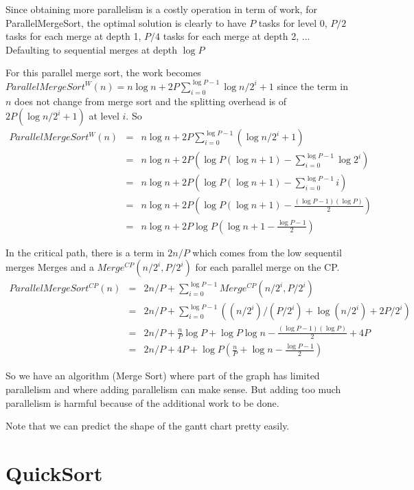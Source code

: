 \documentclass{article}
\begin{document}
Since obtaining more parallelism is a costly operation in term of
work, for ParallelMergeSort, the optimal solution is clearly to have
$P$ tasks for level 0, $P/2$ tasks for each merge at depth 1,
$P/4$ tasks for each merge at depth 2, ... Defaulting to sequential
merges at depth $\log P$

For this parallel merge sort, the work becomes
$ParallelMergeSort^W(n) = n \log n + 2 P \sum_{i=0}^{\log P - 1} \log n/2^i + 1$
since the term in $n$ does not change
from merge sort and the splitting overhead is of $2P (\log n/2^i + 1)$ at
level $i$. So
\begin{align}
  ParallelMergeSort^W(n) & = & n \log n + 2 P \sum_{i=0}^{\log P - 1}( \log n/2^i + 1  )\\
  & = &n \log n + 2 P \left (\log P (\log n +1)- \sum_{i=0}^{\log P - 1} \log 2^i  \right )  \\
  & = &n \log n + 2 P \left (\log P (\log n +1)- \sum_{i=0}^{\log P - 1} i \right )  \\
  & = &n \log n + 2 P \left ( \log P (\log n +1)- \frac{(\log P - 1)(\log P)}{2}   \right) \\
  & = &n \log n + 2 P \log P \left (  \log n + 1 - \frac{\log P - 1}{2}   \right)  
\end{align}

In the critical path, there is a term in $2 n/P$ which comes from the
low sequentil merges Merges and a $Merge^{CP}(n/2^i,P/2^i)$ for each
parallel merge on the CP.
\begin{align}
  ParallelMergeSort^{CP}(n) & = & 2n/P + \sum_{i=0}^{\log P-1} Merge^{CP}(n/2^i,P/2^i) \\
  & = & 2n/P + \sum_{i=0}^{\log P-1} \left ( (n/2^i)/(P/2^i) + \log (n/2^i) + 2P/2^i \right )\\
  & = & 2n/P + \frac{n}{P} \log P  + \log P \log n - \frac{(\log P - 1)(\log P)}{2}  + 4P \\
  & = & 2n/P + 4P + \log P \left ( \frac{n}{P}   +  \log n - \frac{\log P - 1}{2}  \right )
\end{align}

So we have an algorithm (Merge Sort) where part of the graph has
limited parallelism and where adding parallelism can make sense. But
adding too much parallelism is harmful because of the additional work
to be done.

Note that we can predict the shape of the gantt chart pretty easily.

\section{QuickSort}
\end{document}
